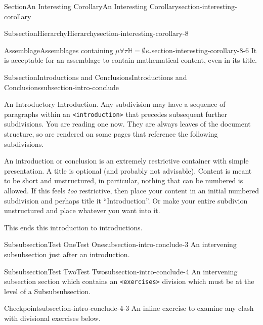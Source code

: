 \documentclass[twoside,10pt,]{article}
\newcommand{\mono}[1]{\texttt{#1}}
\numberwithin{equation}{section}
\begin{document}
\begin{sectionptx}{Section}{An Interesting Corollary}{}{An Interesting Corollary}{}{}{section-interesting-corollary}
\begin{subsectionptx}{Subsection}{Hierarchy}{}{Hierarchy}{}{}{section-interesting-corollary-8}
\begin{assemblage}{Assemblage}{Assemblages containing \(\mu \forall \tau \mathbb{H} = \emptyset \kappa\).}{section-interesting-corollary-8-6}
It is acceptable for an assemblage to contain mathematical content, even in its title.%
\end{assemblage}
\end{subsectionptx}
%
%
\typeout{************************************************}
\typeout{************************************************}
%
\begin{subsectionptx}{Subsection}{Introductions and Conclusions}{}{Introductions and Conclusions}{}{}{subsection-intro-conclude}
\begin{introduction}{An Introductory Introduction.}%
Any subdivision may have a sequence of paragraphs within an \mono{<introduction>} that precedes subsequent further subdivisions.  You are reading one now.  They are always leaves of the document structure, so are rendered on some pages that reference the following subdivisions.%
\par
An introduction or conclusion is an extremely restrictive container with simple presentation.  A title is optional (and probably not advisable).  Content is meant to be short and unstructured, in particular, nothing that can be numbered is allowed.  If this feels \emph{too} restrictive, then place your content in an initial numbered subdivision and perhaps title it ``Introduction''.  Or make your entire subdivion unstructured and place whatever you want into it.%
\par
This ends this introduction to introductions.%
\end{introduction}%
%
%
\typeout{************************************************}
\typeout{************************************************}
%
\begin{subsubsectionptx}{Subsubsection}{Test One}{}{Test One}{}{}{subsection-intro-conclude-3}
An intervening subsubsection just after an introduction.%
\end{subsubsectionptx}
%
%
\typeout{************************************************}
\typeout{************************************************}
%
\begin{subsubsectionptx}{Subsubsection}{Test Two}{}{Test Two}{}{}{subsection-intro-conclude-4}
An intervening subsection section which contains an \mono{<exercises>} division which must be at the level of a Subsubsubsection.%
\begin{inlineexercise}{Checkpoint}{}{subsection-intro-conclude-4-3}%
An inline exercise to examine any clash with divisional exercises below.%

\end{inlineexercise}
\end{subsubsectionptx}
\end{subsectionptx}
\end{sectionptx}
\end{document}
